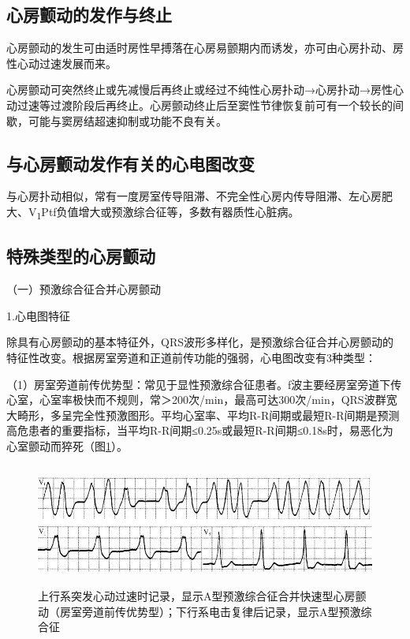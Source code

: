 \protect\hypertarget{text00020.htmlux5cux23subid208}{}{}

\subsection{心房颤动的发作与终止}

心房颤动的发生可由适时房性早搏落在心房易颤期内而诱发，亦可由心房扑动、房性心动过速发展而来。

心房颤动可突然终止或先减慢后再终止或经过不纯性心房扑动→心房扑动→房性心动过速等过渡阶段后再终止。心房颤动终止后至窦性节律恢复前可有一个较长的间歇，可能与窦房结超速抑制或功能不良有关。

\protect\hypertarget{text00020.htmlux5cux23subid209}{}{}

\subsection{与心房颤动发作有关的心电图改变}

与心房扑动相似，常有一度房室传导阻滞、不完全性心房内传导阻滞、左心房肥大、V\textsubscript{1}Ptf负值增大或预激综合征等，多数有器质性心脏病。

\protect\hypertarget{text00020.htmlux5cux23subid210}{}{}

\subsection{特殊类型的心房颤动}

（一）预激综合征合并心房颤动

1.心电图特征

除具有心房颤动的基本特征外，QRS波形多样化，是预激综合征合并心房颤动的特征性改变。根据房室旁道和正道前传功能的强弱，心电图改变有3种类型：

（1）房室旁道前传优势型：常见于显性预激综合征患者。f波主要经房室旁道下传心室，心室率极快而不规则，常＞200次/min，最高可达300次/min，QRS波群宽大畸形，多呈完全性预激图形。平均心室率、平均R-R间期或最短R-R间期是预测高危患者的重要指标，当平均R-R间期≤0.25s或最短R-R间期≤0.18s时，易恶化为心室颤动而猝死（图\ref{fig13-28}）。

\begin{figure}[!htbp]
 \centering
 \includegraphics[width=5.58333in,height=1.58333in]{./images/Image00236.jpg}
 \captionsetup{justification=centering}
 \caption{上行系突发心动过速时记录，显示A型预激综合征合并快速型心房颤动（房室旁道前传优势型）；下行系电击复律后记录，显示A型预激综合征}
 \label{fig13-28}
  \end{figure} 

